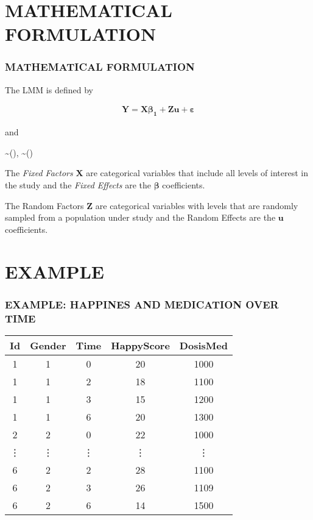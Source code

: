 \documentclass[mathserif]{beamer}
\begin{document}
\section{MATHEMATICAL FORMULATION}
\begin{frame}
	\frametitle{MATHEMATICAL FORMULATION}
	
The LMM is defined by	

	\begin{equation} 
	\begin{gathered}
	\textbf{Y}= \bm{X} \bm{\beta_{1}} + \bm{Z} \bm{u} + \bm{\varepsilon}
	\end{gathered}
	\end{equation}

and 

\item {} \sim {}(), \bm{\varepsilon} \sim {}()

\vspace{3}

The \textit{Fixed Factors} $\bm{X}$ are categorical variables that include all levels of interest in the study and the 
\textit{Fixed Effects} are the $\bm{\beta}$ coefficients.

\vspace{3}

The Random Factors $\bm{Z}$ are categorical variables with levels that are randomly sampled from a population under study and 
the Random Effects are the $\bm{u}$ coefficients.

	 \end{frame}



\section{EXAMPLE}
\begin{frame}
	\frametitle{EXAMPLE: HAPPINES AND MEDICATION OVER TIME}
		
 \begin{tabular}{||c c c c c||} 
 \hline
Id & Gender & Time & HappyScore & DosisMed \\ [0.5ex] 
 \hline\hline
1 & 1 & 0 & 20 & 1000 \\ [0.5ex] 
1 & 1 & 2 & 18 & 1100 \\
1 & 1 & 3 & 15 & 1200 \\
1 & 1 & 6 & 20 & 1300 \\
2 & 2 & 0 & 22 & 1000 \\
\vdots & \vdots & \vdots & \vdots & \vdots \\
6 & 2 & 2 & 28 & 1100 \\
6 & 2 & 3 & 26 & 1109 \\
6 & 2 & 6 & 14 & 1500 \\ [1ex] 
\hline
\end{tabular}

\end{frame}
	
\end{document}
